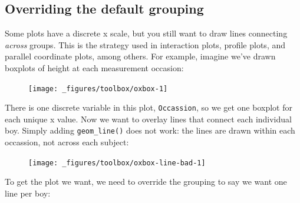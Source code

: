 \subsection{Overriding the default
grouping}\label{overriding-the-default-grouping}

Some plots have a discrete x scale, but you still want to draw lines
connecting \emph{across} groups. This is the strategy used in
interaction plots, profile plots, and parallel coordinate plots, among
others. For example, imagine we've drawn boxplots of height at each
measurement occasion: 

\begin{Shaded}
\begin{Highlighting}[]
\StringTok{ }
\StringTok{  }\NormalTok{()}
\end{Highlighting}
\end{Shaded}

\begin{figure}[H]
  \centering
  \texttt{[image: \_figures/toolbox/oxbox-1]}
\end{figure}

There is one discrete variable in this plot, \texttt{Occassion}, so we
get one boxplot for each unique x value. Now we want to overlay lines
that connect each individual boy. Simply adding \texttt{geom\_line()}
does not work: the lines are drawn within each occassion, not across
each subject:

\begin{Shaded}
\begin{Highlighting}[]
\StringTok{ }
\StringTok{  }\NormalTok{() +}
\StringTok{  }\NormalTok{(} \NormalTok{, } \NormalTok{)}
\end{Highlighting}
\end{Shaded}

\begin{figure}[H]
  \centering
  \texttt{[image: \_figures/toolbox/oxbox-line-bad-1]}
\end{figure}

To get the plot we want, we need to override the grouping to say we want
one line per boy:

\begin{Shaded}
\begin{Highlighting}[]
\StringTok{ }
\StringTok{  }\NormalTok{() +}
\StringTok{  }\NormalTok{(}\NormalTok{(}  \NormalTok{, } \NormalTok{)}
\end{Highlighting}
\end{Shaded}

